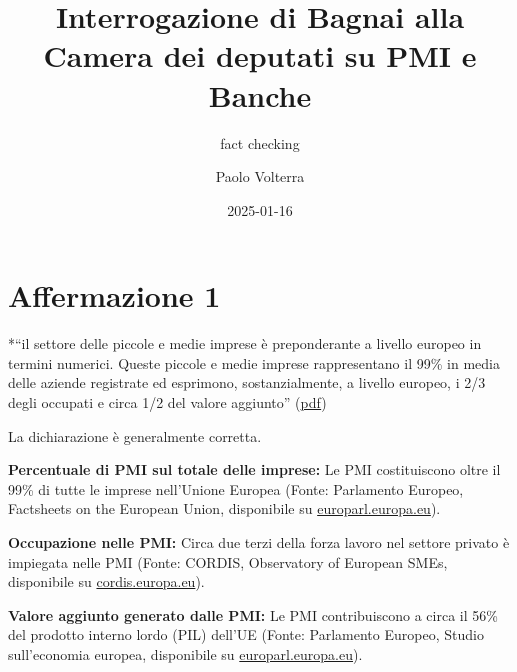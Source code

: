 \documentclass[
  letterpaper,
  DIV=11,
  numbers=noendperiod]{scrartcl}
\title{Interrogazione di Bagnai alla Camera dei deputati su PMI e
Banche}
\subtitle{fact checking}
\author{Paolo Volterra}
\date{2025-01-16}
\begin{document}
\maketitle


\section{Affermazione 1}\label{affermazione-1}

*``il settore delle piccole e medie imprese è preponderante a livello
europeo in termini numerici. Queste piccole e medie imprese
rappresentano il 99\% in media delle aziende registrate ed esprimono,
sostanzialmente, a livello europeo, i 2/3 degli occupati e circa 1/2 del
valore aggiunto''
(\href{zotero://open-pdf/library/items/B4RMZ7B3?page=1&annotation=4TAI7CT2}{pdf})

\begin{tcolorbox}[enhanced jigsaw, coltitle=black, colbacktitle=quarto-callout-warning-color!10!white, bottomtitle=1mm, colback=white, bottomrule=.15mm, breakable, arc=.35mm, opacitybacktitle=0.6, toprule=.15mm, left=2mm, colframe=quarto-callout-warning-color-frame, title=\textcolor{quarto-callout-warning-color}{\faExclamationTriangle}\hspace{0.5em}{Conclusione}, titlerule=0mm, toptitle=1mm, rightrule=.15mm, leftrule=.75mm, opacityback=0]

La dichiarazione è generalmente corretta.

\end{tcolorbox}

\textbf{Percentuale di PMI sul totale delle imprese:} Le PMI
costituiscono oltre il 99\% di tutte le imprese nell'Unione Europea
(Fonte: Parlamento Europeo, Factsheets on the European Union,
disponibile su
\href{https://www.europarl.europa.eu/factsheets/it/sheet/63/piccole-e-medie-imprese}{europarl.europa.eu}).

\textbf{Occupazione nelle PMI:} Circa due terzi della forza lavoro nel
settore privato è impiegata nelle PMI (Fonte: CORDIS, Observatory of
European SMEs, disponibile su
\href{https://cordis.europa.eu/article/id/18356-observatory-of-european-smes-publishes-first-three-reports}{cordis.europa.eu}).

\textbf{Valore aggiunto generato dalle PMI:} Le PMI contribuiscono a
circa il 56\% del prodotto interno lordo (PIL) dell'UE (Fonte:
Parlamento Europeo, Studio sull'economia europea, disponibile su
\href{https://www.europarl.europa.eu/RegData/etudes/ATAG/2021/690633/EPRS_ATA\%282021\%29690633_IT.pdf}{europarl.europa.eu}).
\end{document}
